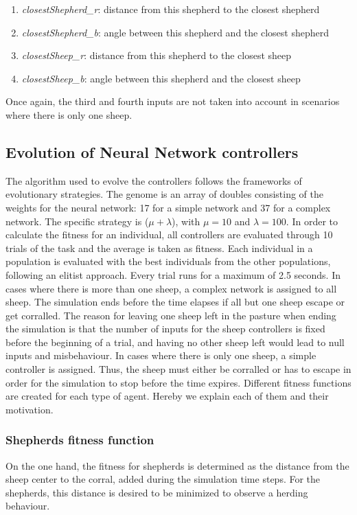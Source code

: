 \documentclass[conference]{IEEEtran}
\begin{document}
\begin{enumerate}
	\item \textit{closestShepherd\_r}: distance from this shepherd to the closest shepherd
	\item \textit{closestShepherd\_b}: angle between this shepherd and the closest shepherd
	\item \textit{closestSheep\_r}: distance from this shepherd to the closest sheep
	\item \textit{closestSheep\_b}: angle between this shepherd and the closest sheep
\end{enumerate}

Once again, the third and fourth inputs are not taken into account in scenarios where there is only one sheep. 

\subsection{Evolution of Neural Network controllers}
The algorithm used to evolve the controllers follows the frameworks of evolutionary strategies. 
The genome is an array of doubles consisting of the weights for the neural network: 17 for a simple network and 37 for a complex network. The specific strategy is ($\mu + \lambda$), with $\mu = 10$ and $\lambda = 100$. 
In order to calculate the fitness for an individual, all controllers are evaluated through 10 trials of the task and the average is taken as fitness.
Each individual in a population is evaluated with the best individuals from the other populations, following an elitist approach.
Every trial runs for a maximum of 2.5 seconds. 
In cases where there is more than one sheep, a complex network is assigned to all sheep. 
The simulation ends before the time elapses if all but one sheep escape or get corralled. 
The reason for leaving one sheep left in the pasture when ending the simulation is that the number of inputs for the sheep controllers is fixed before the beginning of a trial, and having no other sheep left would lead to null inputs and misbehaviour. 
In cases where there is only one sheep, a simple controller is assigned. 
Thus, the sheep must either be corralled or has to escape in order for the simulation to stop before the time expires.
Different fitness functions are created for each type of agent. 
Hereby we explain each of them and their motivation.
\vspace{1em}
\subsubsection{Shepherds fitness function}
On the one hand, the fitness for shepherds is determined as the distance from the sheep center to the corral, added during the simulation time steps. For the shepherds, this distance is desired to be minimized to observe a herding behaviour.  
\end{document}
